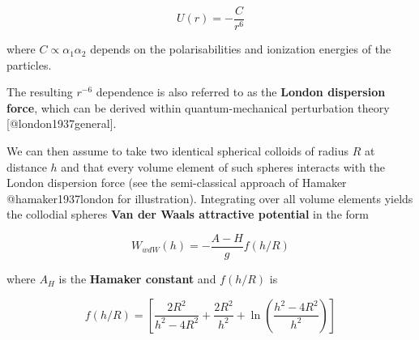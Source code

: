 \documentclass[
  letterpaper,
  enabledeprecatedfontcommands]{report}
\begin{document}
\[
    U(r) = -\frac{C}{r^6}
\]

where \(C \propto \alpha_1 \alpha_2\) depends on the polarisabilities
and ionization energies of the particles.

The resulting \(r^{-6}\) dependence is also referred to as the
\textbf{London dispersion force}, which can be derived within
quantum-mechanical perturbation theory {[}@london1937general{]}.

We can then assume to take two identical spherical colloids of radius
\(R\) at distance \(h\) and that every volume element of such spheres
interacts with the London dispersion force (see the semi-classical
approach of Hamaker @hamaker1937london for illustration). Integrating
over all volume elements yields the collodial spheres \textbf{Van der
Waals attractive potential} in the form

\[W_{wdW}(h)=-\dfrac{A-H}{g}f(h/R)\]

where \(A_H\) is the \textbf{Hamaker constant} and \(f(h/R)\) is

\[f(h/R) = \left[ \frac{2R^2}{h^2 - 4R^2} + \frac{2R^2}{h^2} + \ln\left( \frac{h^2 - 4R^2}{h^2} \right) \right]\]
\end{document}
